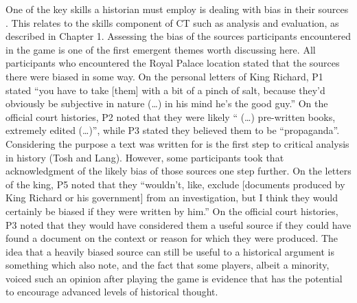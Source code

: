\documentclass{l4proj}
\begin{document}
One of the key skills a historian must employ is dealing with bias in their sources \citep{tosh2006pursuit}. This relates to the skills component of CT such as analysis and evaluation, as described in Chapter 1. Assessing the bias of the sources participants encountered in the game is one of the first emergent themes worth discussing here. All participants who encountered the Royal Palace location stated that the sources there were biased in some way. On the personal letters of King Richard, P1 stated “you have to take [them] with a bit of a pinch of salt, because they’d obviously be subjective in nature (…) in his mind he’s the good guy.” On the official court histories, P2 noted that they were likely “ (…) pre-written books, extremely edited (…)”, while P3 stated they believed them to be “propaganda”. Considering the purpose a text was written for is the first step to critical analysis in history (Tosh and Lang). However, some participants took that acknowledgment of the likely bias of those sources one step further. On the letters of the king, P5 noted that they “wouldn’t, like, exclude [documents produced by King Richard or his government] from an investigation, but I think they would certainly be biased if they were written by him.” On the official court histories, P3 noted that they would have considered them a useful source if they could have found a document on the context or reason for which they were produced. The idea that a heavily biased source can still be useful to a historical argument is something which \citet{tosh2006pursuit} also note, and the fact that some players, albeit a minority, voiced such an opinion after playing the game is evidence that has the potential to encourage advanced levels of historical thought.
\end{document}
